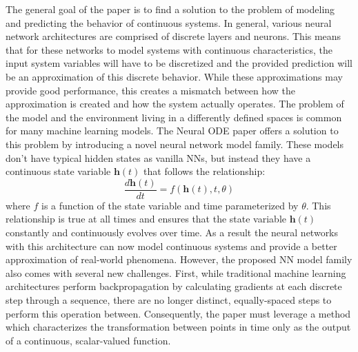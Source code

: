 \documentclass{article}
\begin{document}
The general goal of the paper is to find a solution to the problem of modeling and predicting the behavior of continuous systems. In general, various neural network architectures are comprised of discrete layers and neurons. This means that for these networks to model systems with continuous characteristics, the input system variables will have to be discretized and the provided prediction will be an approximation of this discrete behavior. While these approximations may provide good performance, this creates a mismatch between how the approximation is created and how the system actually operates. The problem of the model and the environment living in a differently defined spaces is common for many machine learning models. 
The Neural ODE paper offers a solution to this problem by introducing a novel neural network model family. These models don't have typical hidden states as vanilla NNs, but instead they have a continuous state variable \(\mathbf{h}(t)\) that follows the relationship: 
\begin{equation}
    \frac{d\mathbf{h}(t)}{dt} = f(\mathbf{h}(t), t, \theta)    
\end{equation}
where \(f\) is a function of the state variable and time parameterized by $\theta$. This relationship is true at all times and ensures that the state variable $\mathbf{h}(t)$ constantly and continuously evolves over time. As a result the neural networks with this architecture can now model continuous systems and provide a better approximation of real-world phenomena. However, the proposed NN model family also comes with several new challenges. First, while traditional machine learning architectures perform backpropagation by calculating gradients at each discrete step through a sequence, there are no longer distinct, equally-spaced steps to perform this operation between. Consequently, the paper must leverage a method which characterizes the transformation between points in time only as the output of a continuous, scalar-valued function.
\end{document}
